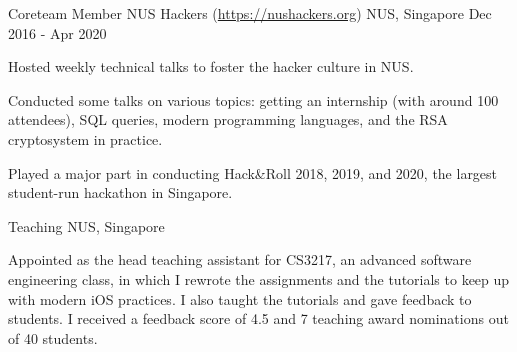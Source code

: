 

\begin{cventries}


  \cventry
  {Coreteam Member} %
  {NUS Hackers (\url{https://nushackers.org})} %
  {NUS, Singapore} %
  {Dec 2016 - Apr 2020} %
  { %
    \begin{cvitems}
    \item {Hosted weekly technical talks to foster the hacker culture in NUS.}
    \item {Conducted some talks on various topics: getting an internship (with around 100 attendees), SQL queries, modern programming languages, and the RSA cryptosystem in practice.}
    \item {Played a major part in conducting Hack\&Roll 2018, 2019, and 2020, the largest student-run hackathon in Singapore.}
    \end{cvitems}
  }


  \cventry
  {} %
  {Teaching} %
  {NUS, Singapore} %
  {} %
  { %
    \begin{cvitems}
    \item {Appointed as the head teaching assistant for CS3217, an advanced software engineering class, in which I rewrote the assignments and the tutorials to keep up with modern iOS practices. I also taught the tutorials and gave feedback to students. I received a feedback score of 4.5 and 7 teaching award nominations out of 40 students.}
    \end{cvitems}
  }

\end{cventries}
